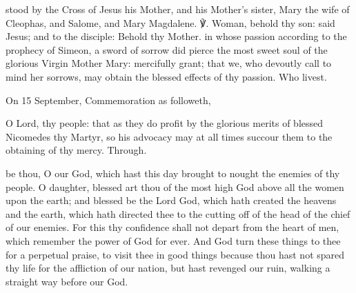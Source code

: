 

\clearpage
{}

\introit
{} stood by the Cross of Jesus his Mother, and his Mother's sister, Mary the wife of Cleophas, and Salome, and Mary Magdalene. ℣. Woman, behold thy son: said Jesus; and to the disciple: Behold thy Mother.
\collect
{} in whose passion according to the prophecy of Simeon, a sword of sorrow did pierce the most sweet soul of the glorious Virgin Mother Mary: mercifully grant; that we, who devoutly call to mind her sorrows, may obtain the blessed effects of thy passion. Who livest.
\begin{rubric}
	 On 15 September, Commemoration  as followeth,
\end{rubric}
 O Lord, thy people: that as they do profit by the glorious merits of blessed Nicomedes thy Martyr, so his advocacy may at all times succour them to the obtaining of thy mercy. Through.

 be thou, O our God, which hast this day brought to nought the enemies of thy people. O daughter, blessed art thou of the most high God above all the women upon the earth; and blessed be the Lord God, which hath created the heavens and the earth, which hath directed thee to the cutting off of the head of the chief of our enemies. For this thy confidence shall not depart from the heart of men, which remember the power of God for ever. And God turn these things to thee for a perpetual praise, to visit thee in good things because thou hast not spared thy life for the affliction of our nation, but hast revenged our ruin, walking a straight way before our God.

